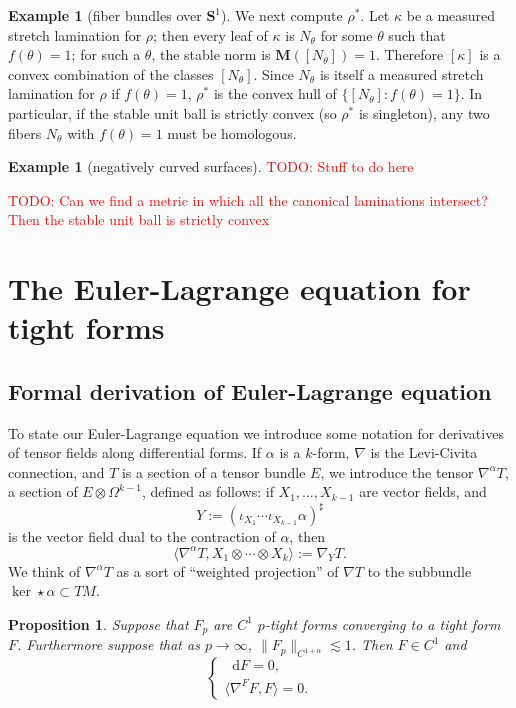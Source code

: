 \documentclass[reqno,11pt]{amsart}
\newcommand{\Sph}{\mathbf S}
\newcommand*\dif{\mathop{}\!\mathrm{d}}
\newcommand{\Mass}{\mathbf M}
\newtheorem{proposition}[theorem]{Proposition}
\theoremstyle{definition}
\newtheorem{example}[theorem]{Example}
\numberwithin{equation}{section}
\newcommand\todo[1]{\textcolor{red}{TODO: #1}}
\begin{document}
\begin{example}[fiber bundles over $\Sph^1$]
We next compute $\rho^*$.
Let $\kappa$ be a measured stretch lamination for $\rho$; then every leaf of $\kappa$ is $N_\theta$ for some $\theta$ such that $f(\theta) = 1$; for such a $\theta$, the stable norm is $\Mass([N_\theta]) = 1$.
Therefore $[\kappa]$ is a convex combination of the classes $[N_\theta]$.
Since $N_\theta$ is itself a measured stretch lamination for $\rho$ if $f(\theta) = 1$, $\rho^*$ is the convex hull of $\{[N_\theta]: f(\theta) = 1\}$.
In particular, if the stable unit ball is strictly convex (so $\rho^*$ is singleton), any two fibers $N_\theta$ with $f(\theta) = 1$ must be homologous.
\end{example}

\begin{example}[negatively curved surfaces]
\todo{Stuff to do here}
\end{example}

\todo{Can we find a metric in which all the canonical laminations intersect? Then the stable unit ball is strictly convex}


\section{The Euler-Lagrange equation for tight forms}\label{infinityMax}
\subsection{Formal derivation of Euler-Lagrange equation}
To state our Euler-Lagrange equation we introduce some notation for derivatives of tensor fields along differential forms.
If $\alpha$ is a $k$-form, $\nabla$ is the Levi-Civita connection, and $T$ is a section of a tensor bundle $E$, we introduce the tensor $\nabla^\alpha T$, a section of $E \otimes \Omega^{k - 1}$, defined as follows: if $X_1, \dots, X_{k - 1}$ are vector fields, and
$$Y := (\iota_{X_1} \cdots \iota_{X_{k - 1}} \alpha)^\sharp$$
is the vector field dual to the contraction of $\alpha$, then
$$\langle \nabla^\alpha T, X_1 \otimes \cdots \otimes X_k\rangle := \nabla_Y T.$$
We think of $\nabla^\alpha T$ as a sort of ``weighted projection'' of $\nabla T$ to the subbundle $\ker \star \alpha \subset TM$.

\begin{proposition}
Suppose that $F_p$ are $C^1$ $p$-tight forms converging to a tight form $F$.
Furthermore suppose that as $p \to \infty$, $\|F_p\|_{C^{1 + \alpha}} \lesssim 1$.
Then $F \in C^1$ and 
\begin{equation}\label{infty Max}
\begin{cases}
\dif F = 0, \\
\langle \nabla^F F, F\rangle = 0.
\end{cases}
\end{equation}
\end{proposition}
\end{document}

